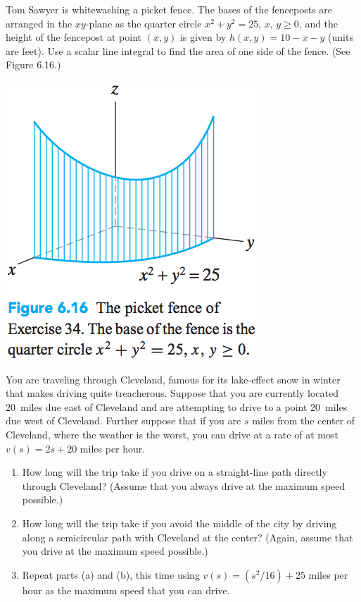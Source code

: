 \documentclass[12pt,letterpaper]{hmcpset}
\begin{document}
\begin{problem}[Colley 6.1.34]
    Tom Sawyer is whitewashing a picket fence. The bases of the
    fenceposts are arranged in the $xy$-plane as the quarter circle
    $x^2+y^2=25$, $x$, $y\geq0$, and the height of the fencepost at
    point $(x,y)$ is given by $h(x,y)=10-x-y$ (units are feet). Use a
    scalar line integral to find the area of one side of the
    fence. (See Figure 6.16.)
    \begin{center}
        \includegraphics{img/6_1_34}
    \end{center}
\end{problem}
\begin{solution}
    \vfill
\end{solution}
\newpage

\begin{problem}[Colley 6.1.40]
    You are traveling through Cleveland, famous for its lake-effect
    snow in winter that makes driving quite treacherous. Suppose that
    you are currently located \SI{20}{miles} due east of Cleveland and
    are attempting to drive to a point \SI{20}{miles} due west of
    Cleveland. Further suppose that if you are $s$ miles from the
    center of Cleveland, where the weather is the worst, you can drive
    at a rate of at most $v(s)=2s+20$ miles per hour.
    \begin{enumerate}
        \item How long will the trip take if you drive on a
            straight-line path directly through Cleveland? (Assume that
            you always drive at the maximum speed possible.)
        \item How long will the trip take if you avoid the middle of
            the city by driving along a semicircular path with Cleveland
            at the center? (Again, assume that you drive at the maximum
            speed possible.)
        \item Repeat parts (a) and (b), this time using
            $v(s)=(s^2/16)+25$ miles per hour as the maximum speed that
            you can drive.
    \end{enumerate}
\end{problem}
\begin{solution}
    \vfill
\end{solution}
\end{document}
